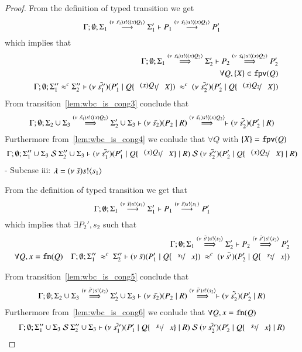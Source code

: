 \begin{proof}
	\noi From the definition of typed transition we get
	\[
		\Gamma; \emptyset; \Sigma_1 \stackrel{(\nu\ \tilde{s_3}) s ! \langle (x)Q_1 \rangle}{\longrightarrow} \Sigma_1' \vdash P_1 \stackrel{(\nu\ \tilde{s_3}) s ! \langle (x)Q_1 \rangle}{\longrightarrow} P_1'
	\]
	\noi which implies that
%
	\begin{eqnarray}
		&&\Gamma; \emptyset; \Sigma_1 \By{\news{\tilde{s_4}} \bactout{s}{\abs{x}{Q_2}}} \Sigma_2' \proves P_2 \By{\news{\tilde{s_4}} \bactout{s}{\abs{x}{Q_2}}} P_2' \label{lem:wbc_is_cong3} \\
		&&\forall Q, \set{X} \in \fpv{Q} \\
		&&\Gamma; \emptyset; \Sigma_1'' \wbc \Sigma_2'' \proves \newsp{\tilde{s_1''}}{P_1' \Par Q \subst{(x) Q_1}{X}}\ \wbc\ \newsp{\tilde{s_2''}}{P_2' \Par Q \subst{(x) Q_2}{X}} \label{lem:wbc_is_cong4}
	\end{eqnarray}
%
	\noi From transition~\ref{lem:wbc_is_cong3} conclude that 
	\[
		\Gamma;\emptyset; \Sigma_2 \cup \Sigma_3 \stackrel{(\nu\ \tilde{s_4}) s ! \langle (x)Q_2 \rangle}{\Longrightarrow} \Sigma_2' \cup \Sigma_3 \vdash (\nu\ \tilde{s_2})(P_2 \;|\; R) \stackrel{(\nu\ \tilde{s_4}) s ! \langle (x)Q_2 \rangle}{\Longrightarrow} \vdash (\nu\ \tilde{s_2'})(P_2' \;|\; R)
	\]
%
	\noi Furthermore from~\ref{lem:wbc_is_cong4} we conlude that $\forall Q$ with $\{X\} = \mathtt{fpv}(Q)$
%
	\[
		\Gamma; \emptyset; \Sigma_1'' \cup \Sigma_3\ \mathcal{S}\ \Sigma_2'' \cup \Sigma_3 \proves \newsp{\tilde{s_1''}}{P_1' \Par Q \subst{(x) Q_1}{X} \Par R}\ \mathcal{S}\ \newsp{\tilde{s_2''}}{P_2' \Par Q \subst{(x) Q_2}{X} \Par R}
	\]
%
	- Subcase iii: $\lambda = (\nu\ \tilde{s}) s ! \langle s_1 \rangle$

	\noi From the definition of typed transition we get that
	\[
		\Gamma; \emptyset; \Sigma_1 \stackrel{(\nu\ \tilde{s}) s ! \langle s_1 \rangle}{\longrightarrow} \Sigma_1' \vdash P_1 \stackrel{(\nu\ \tilde{s}) s ! \langle s_1 \rangle}{\longrightarrow} P_1'
	\]
	\noi which implies that $\exists P_2', s_2$ such that
%
	\begin{eqnarray}
		&& \Gamma; \emptyset; \Sigma_1 \By{\news{\tilde{s'}} \bactout{s}{s_2}} \Sigma_2' \proves P_2 \By{\news{\tilde{s'}} \bactout{s}{s_2}} P_2' \label{lem:wbc_is_cong5}\\
		\forall Q, x = \fn{Q}  &&
		\Gamma; \emptyset; \Sigma_1''\ \wbc\ \Sigma_2'' \proves \newsp{\tilde{s}}{P_1' \Par Q \subst{s_1}{x}}\ \wbc\ \newsp{\tilde{s'}}{P_2' \Par Q \subst{s_2}{x}} \label{lem:wbc_is_cong6}
	\end{eqnarray}

%
	\noi From transition~\ref{lem:wbc_is_cong5} conclude that 
	\[
		\Gamma;\emptyset; \Sigma_2 \cup \Sigma_3 \stackrel{(\nu\ \tilde{s'}) s ! \langle s_2 \rangle}{\Longrightarrow} \Sigma_2' \cup \Sigma_3 \vdash (\nu\ \tilde{s_2})(P_2 \;|\; R) \stackrel{(\nu\ \tilde{s'}) s ! \langle s_2 \rangle}{\Longrightarrow} \vdash (\nu\ \tilde{s_2'})(P_2' \;|\; R)
	\]
%
	\noi Furthermore from~\ref{lem:wbc_is_cong6} we conlude that $\forall Q, x = \mathtt{fn}(Q)$
%
	\[
		\Gamma; \emptyset; \Sigma_1'' \cup \Sigma_3\ \mathcal{S}\ \Sigma_2'' \cup \Sigma_3 \proves \newsp{\tilde{s_1''}}{P_1' \Par Q \subst{s_1}{x} \Par R}\ \mathcal{S}\ \newsp{\tilde{s_2''}}{P_2' \Par Q \subst{s_2}{x} \Par R}
	\]
%


\end{proof}

